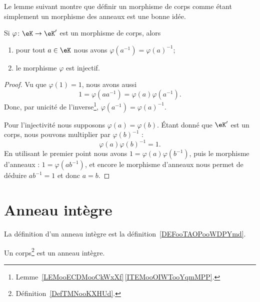 Le lemme suivant montre que définir un morphisme de corps comme étant simplement un morphisme des anneaux est une bonne idée.
\begin{lemma}       \label{LEMooWBOPooZnsZgQ}
    Si \( \varphi\colon \eK\to \eK'\) est un morphisme de corps, alors
    \begin{enumerate}
        \item
            pour tout \( a\in \eK\) nous avons \( \varphi(a^{-1})=\varphi(a)^{-1}\);
        \item
            le morphisme \( \varphi\) est injectif.
    \end{enumerate}
\end{lemma}

\begin{proof}
    Vu que \( \varphi(1)=1\), nous avons aussi
    \begin{equation}
        1=\varphi(aa^{-1})=\varphi(a)\varphi(a^{-1}).
    \end{equation}
    Donc, par unicité de l'inverse\footnote{Lemme~\ref{LEMooECDMooCkWxXf}\,\ref{ITEMooOIWTooYqmMPP}.}, \( \varphi(a^{-1})=\varphi(a)^{-1}\).

    Pour l'injectivité nous supposons \( \varphi(a)=\varphi(b)\). Étant donné que \( \eK'\) est un corps, nous pouvons multiplier par \( \varphi(b)^{-1}\) :
    \begin{equation}
        \varphi(a)\varphi(b)^{-1}=1.
    \end{equation}
    En utilisant le premier point nous avons \( 1=\varphi(a)\varphi(b^{-1})\), puis le morphisme d'anneaux : \( 1=\varphi(ab^{-1})\), et encore le morphisme d'anneaux nous permet de déduire \( ab^{-1}=1\) et donc \(a=b\).
\end{proof}

\section{Anneau intègre}
\label{SECAnneauxIntegres}

La définition d'un anneau intègre est la définition~\ref{DEFooTAOPooWDPYmd}.

\begin{lemma}     \label{LEMooZSMEooUmSXWZ}
    Un corps\footnote{Définition~\ref{DefTMNooKXHUd}.} est un anneau intègre.
\end{lemma}

